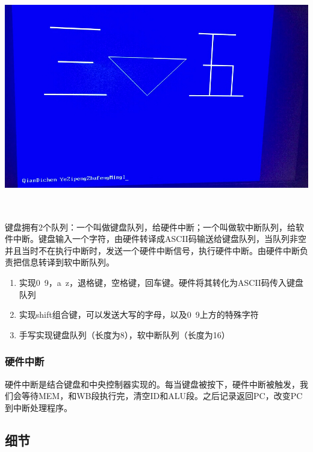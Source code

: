 \begin{center}
    \includegraphics[height=10cm]{image/extension/35.JPG}
    \label{fig:35}
\end{center}

键盘拥有2个队列：一个叫做键盘队列，给硬件中断；一个叫做软中断队列，给软件中断。键盘输入一个字符，由硬件转译成ASCII码输送给键盘队列，当队列非空并且当时不在执行中断时，发送一个硬件中断信号，执行硬件中断。由硬件中断负责把信息转译到软中断队列。

\begin{enumerate}
    \item 实现0~9，a~z，退格键，空格键，回车键。硬件将其转化为ASCII码传入键盘队列
    \item 实现shift组合键，可以发送大写的字母，以及0~9上方的特殊字符
    \item 手写实现键盘队列（长度为8），软中断队列（长度为16）
\end{enumerate}


\subsubsection{硬件中断}

硬件中断是结合键盘和中央控制器实现的。每当键盘被按下，硬件中断被触发，我们会等待MEM，和WB段执行完，清空ID和ALU段。之后记录返回PC，改变PC到中断处理程序。


\subsection{细节}

